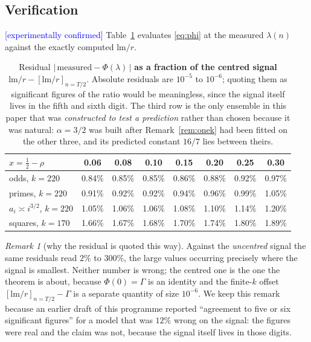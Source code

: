 \documentclass[11pt,a4paper]{article}
\theoremstyle{plain}
\theoremstyle{definition}
\theoremstyle{remark}
\newtheorem{remark}[theorem]{Remark}
\newcommand{\lm}{\mathrm{lm}}
\newcommand{\STATUS}[1]{\textcolor{blue}{\textsf{[#1]}}}
\begin{document}
\subsection{Verification}\label{sec:table1}

\STATUS{experimentally confirmed} Table~\ref{tab:one} evaluates \eqref{eq:phi} at the measured
$\lambda(n)$ against the exactly computed $\lm/r$.

\begin{table}[htbp]
\centering
\small
\begin{tabular}{lccccccc}
\toprule
$x=\frac12-\rho$ & 0.06 & 0.08 & 0.10 & 0.15 & 0.20 & 0.25 & 0.30\\
\midrule
odds, $k=220$      & 0.84\% & 0.85\% & 0.85\% & 0.86\% & 0.88\% & 0.92\% & 0.97\%\\
primes, $k=220$    & 0.91\% & 0.92\% & 0.92\% & 0.94\% & 0.96\% & 0.99\% & 1.05\%\\
$a_i\asymp i^{3/2}$, $k=220$ & 1.05\% & 1.06\% & 1.06\% & 1.08\% & 1.10\% & 1.14\% & 1.20\%\\
squares, $k=170$   & 1.66\% & 1.67\% & 1.68\% & 1.70\% & 1.74\% & 1.80\% & 1.89\%\\
\bottomrule
\end{tabular}
\caption{Residual $|\,\mathrm{measured}-\Phi(\lambda)\,|$ \textbf{as a fraction of the centred
signal} $\lm/r-[\lm/r]_{n=T/2}$. Absolute residuals are $10^{-5}$ to $10^{-6}$; quoting
them as significant figures of the ratio would be meaningless, since the signal itself lives in
the fifth and sixth digit. The third row is the only ensemble in this paper that was
\emph{constructed to test a prediction} rather than chosen because it was natural: $\alpha=3/2$
was built after Remark~\ref{rem:onek} had been fitted on the other three, and its predicted
constant $16/7$ lies between theirs.}
\label{tab:one}
\end{table}

\begin{remark}[why the residual is quoted this way]\label{rem:signalfraction}
Against the \emph{uncentred} signal the same residuals read $2\%$ to $300\%$, the large values
occurring precisely where the signal is smallest. Neither number is wrong; the centred one is
the one the theorem is about, because $\Phi(0)=\Gamma$ is an identity and the finite-$k$ offset
$[\lm/r]_{n=T/2}-\Gamma$ is a separate quantity of size $10^{-6}$.
We keep this remark because an earlier draft of this programme reported ``agreement to five or
six significant figures'' for a model that was $12\%$ wrong on the signal: the figures were
real and the claim was not, because the signal itself lives in those digits.
\end{remark}
\end{document}

